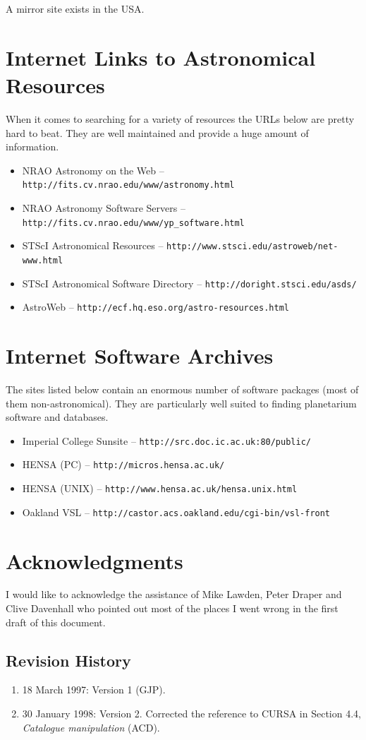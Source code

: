 \documentclass[twoside,11pt]{article}
\newcommand{\htmladdnormallink}[2]{#1}
\newcommand{\xlabel}[1]{}
\newcommand{\HTTPWref}{\htmladdnormallink{\tt http://fits.cv.nrao.edu/www/astronomy.html}{http://fits.cv.nrao.edu/www/astronomy.html}}
\newcommand{\HTTPXref}{\htmladdnormallink{\tt http://www.stsci.edu/astroweb/net-www.html}{http://www.stsci.edu/astroweb/net-www.html}}
\newcommand{\HTTPYref}{\htmladdnormallink{\tt http://fits.cv.nrao.edu/www/yp\_{}software.html}{http://fits.cv.nrao.edu/www/yp\_{}software.html}}
\newcommand{\HTTPZref}{\htmladdnormallink{\tt http://doright.stsci.edu/asds/}{http://doright.stsci.edu/asds/}}
\newcommand{\HTTPAAref}{\htmladdnormallink{\tt http://src.doc.ic.ac.uk:80/public/}{http://src.doc.ic.ac.uk:80/public/}}
\newcommand{\HTTPABref}{\htmladdnormallink{\tt http://micros.hensa.ac.uk/}{http://micros.hensa.ac.uk/}}
\newcommand{\HTTPACref}{\htmladdnormallink{\tt http://www.hensa.ac.uk/hensa.unix.html}{http://www.hensa.ac.uk/hensa.unix.html}}
\newcommand{\HTTPADref}{\htmladdnormallink{\tt http://castor.acs.oakland.edu/cgi-bin/vsl-front}{http://castor.acs.oakland.edu/cgi-bin/vsl-front}}
\newcommand{\HTTPBGref}{\htmladdnormallink{\tt http://ecf.hq.eso.org/astro-resources.html}{http://http://ecf.hq.eso.org/astro-resources.html}}
\begin{document}
A mirror site exists in the USA.

\section{Internet Links to Astronomical Resources} \xlabel{LINKS}
\label{sec:links}

When it comes to searching for a variety of resources the URLs below
are pretty hard to beat. They are well maintained and provide a huge amount
of information.

\begin{itemize}
\item NRAO  Astronomy on the Web -- {\HTTPWref}
\item NRAO Astronomy Software Servers -- {\HTTPYref}
\item STScI Astronomical Resources -- {\HTTPXref}
\item STScI Astronomical Software Directory  -- {\HTTPZref}
\item AstroWeb -- {\HTTPBGref}
\end{itemize}

\section{Internet Software Archives} \xlabel{GENERAL}
\label{sec:general}

The sites listed below contain an enormous number of software packages (most
of them non-astronomical). They are particularly well suited to finding
planetarium software and databases.

\begin{itemize}
\item Imperial College Sunsite -- {\HTTPAAref}
\item HENSA (PC) -- {\HTTPABref}
\item HENSA (UNIX) -- {\HTTPACref}
\item Oakland VSL -- {\HTTPADref}
\end{itemize}

\section{Acknowledgments} \xlabel{ACK}
\label{sec:ack}

I would like to acknowledge the assistance of Mike Lawden, Peter Draper and
Clive Davenhall who pointed out most of the places I went wrong
in the first draft of this document.

\vspace{3cm}

\subsection*{Revision History}

\begin{enumerate}

  \item 18 March 1997: Version 1 (GJP).

  \item 30 January 1998: Version 2.  Corrected the reference to CURSA
   in Section 4.4, {\it Catalogue manipulation\/} (ACD).

\end{enumerate}
\end{document}

